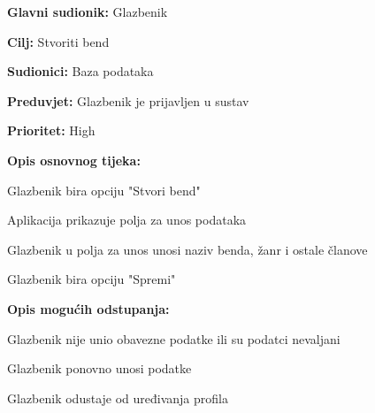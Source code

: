 \noindent {}
	\begin{packed_item}
		
		\item \textbf{Glavni sudionik:} Glazbenik 
		\item \textbf{Cilj:} Stvoriti bend
		\item \textbf{Sudionici:} Baza podataka
		\item \textbf{Preduvjet:} Glazbenik je prijavljen u sustav
		\item \textbf{Prioritet:} High
		\item \textbf{Opis osnovnog tijeka:} 
		
		\item[] \begin{packed_enum}
			
			\item Glazbenik bira opciju "Stvori bend"
			\item Aplikacija prikazuje polja za unos podataka
			\item Glazbenik u polja za unos unosi naziv benda, žanr i ostale članove
			\item Glazbenik bira opciju "Spremi"
		\end{packed_enum}
	
		\item  \textbf{Opis mogućih odstupanja:}
		\item[] \begin{packed_item}
			
			\item[4.a] Glazbenik nije unio obavezne podatke ili su podatci nevaljani
			\item[] \begin{packed_enum}
				
				\item Glazbenik ponovno unosi podatke
				\item Glazbenik odustaje od uređivanja profila
				
			\end{packed_enum}	
		\end{packed_item}
	\end{packed_item}

